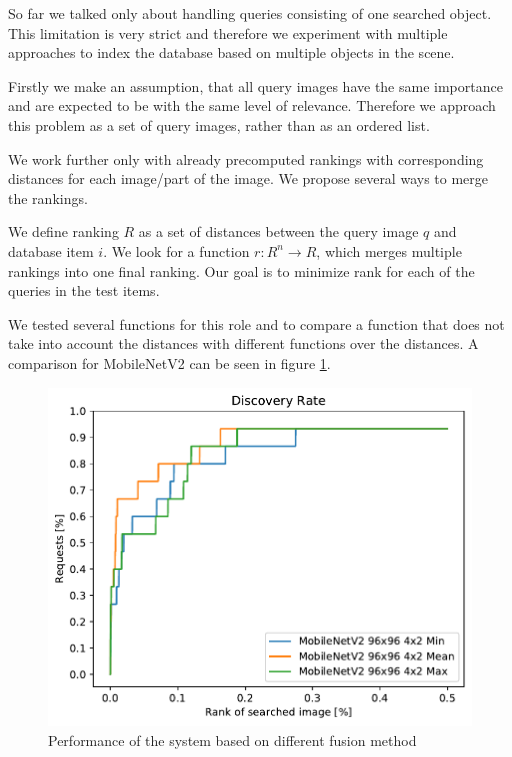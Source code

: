So far we talked only about handling queries consisting of one searched object. This limitation is very strict and therefore we experiment with multiple approaches to index the database based on multiple objects in the scene.

Firstly we make an assumption, that all query images have the same importance and are expected to be with the same level of relevance. Therefore we approach this problem as a set of query images, rather than as an ordered list.

We work further only with already precomputed rankings with corresponding distances for each image/part of the image. We propose several ways to merge the rankings.

We define ranking $R$ as a set of distances between the query image $q$ and database item $i$. We look for a function $r: R^n \rightarrow R$, which merges multiple rankings into one final ranking. Our goal is to minimize rank for each of the queries in the test items.

We tested several functions for this role and to compare a function that does not take into account the distances with different functions over the distances. A comparison for MobileNetV2 can be seen in figure \ref{fig:ranking_funcs}.

\begin{figure}
\centering
\includegraphics[width=\textwidth]{graphs/362cb9a687ce05c7732f973defca88fb8c5c393f5992066521343314698c9de7}
\caption{Performance of the system based on different fusion method}
\label{fig:ranking_funcs}
\end{figure}

